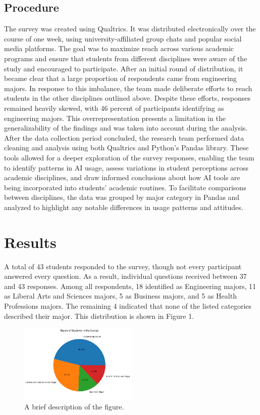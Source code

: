 \documentclass[12pt]{article}
\begin{document}
\subsection{Procedure}
\label{subsec:procedure}
The survey was created using Qualtrics. It was distributed electronically over the course of one week, using university-affiliated group chats and popular social media platforms. The goal was to maximize reach across various academic programs and ensure that students from different disciplines were aware of the study and encouraged to participate.
After an initial round of distribution, it became clear that a large proportion of respondents came from engineering majors. In response to this imbalance, the team made deliberate efforts to reach students in the other disciplines outlined above. Despite these efforts, responses remained heavily skewed, with 46 percent of participants identifying as engineering majors. This overrepresentation presents a limitation in the generalizability of the findings and was taken into account during the analysis.
After the data collection period concluded, the research team performed data cleaning and analysis using both Qualtrics and Python’s Pandas library. These tools allowed for a deeper exploration of the survey responses, enabling the team to identify patterns in AI usage, assess variations in student perceptions across academic disciplines, and draw informed conclusions about how AI tools are being incorporated into students’ academic routines. To facilitate comparisons between disciplines, the data was grouped by major category in Pandas and analyzed to highlight any notable differences in usage patterns and attitudes.

\section{Results}
A total of 43 students responded to the survey, though not every participant answered every question. As a result, individual questions received between 37 and 43 responses. Among all respondents, 18 identified as Engineering majors, 11 as Liberal Arts and Sciences majors, 5 as Business majors, and 5 as Health Professions majors. The remaining 4 indicated that none of the listed categories described their major. This distribution is shown in Figure 1. 

\begin{figure}[htbp]
  \centering
  \includegraphics[width=0.5\textwidth]{fig1.png} %
  \caption{A brief description of the figure.}
  \label{fig:example1}
\end{figure}
\end{document}
